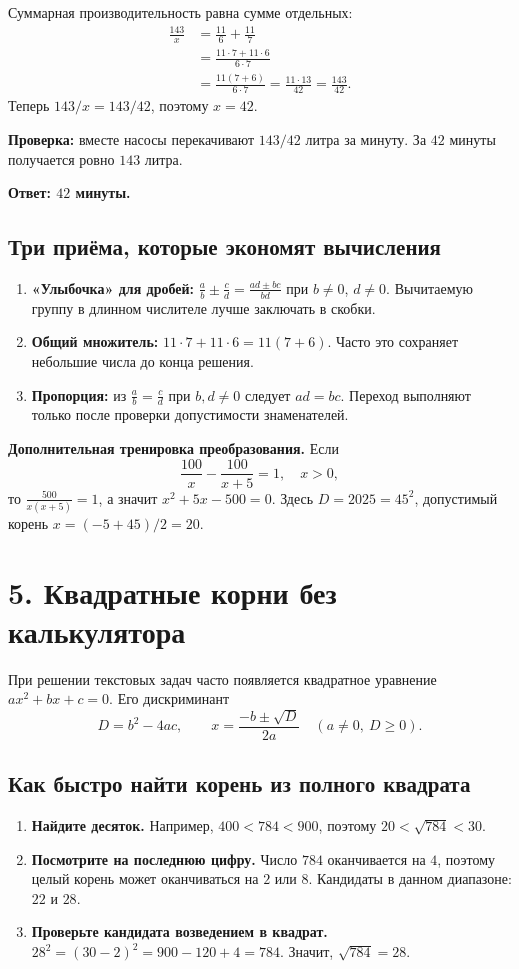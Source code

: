 \documentclass[a4paper,12pt]{article}
\newcommand{\topic}[1]{\section*{\textcolor{darkaccent}{#1}}}
\newcommand{\subtopic}[1]{\subsection*{\textcolor{darkaccent}{#1}}}
\newcommand{\linekey}[1]{\textcolor{darkaccent}{\textbf{#1}}}
\begin{document}
Суммарная производительность равна сумме отдельных:
\begin{align*}
\frac{143}{x}&=\frac{11}{6}+\frac{11}{7}\\
&=\frac{11\cdot7+11\cdot6}{6\cdot7}\\
&=\frac{11(7+6)}{6\cdot7}=\frac{11\cdot13}{42}=\frac{143}{42}.
\end{align*}
Теперь $143/x=143/42$, поэтому $x=42$.

\linekey{Проверка:} вместе насосы перекачивают $143/42$ литра за минуту. За $42$ минуты получается ровно $143$ литра.

\linekey{Ответ: $42$ минуты.}

\subtopic{Три приёма, которые экономят вычисления}
\begin{enumerate}[itemsep=3pt]
\item \textbf{«Улыбочка» для дробей:} $\displaystyle\frac{a}{b}\pm\frac{c}{d}=\frac{ad\pm bc}{bd}$ при $b\ne0$, $d\ne0$. Вычитаемую группу в длинном числителе лучше заключать в скобки.
\item \textbf{Общий множитель:} $11\cdot7+11\cdot6=11(7+6)$. Часто это сохраняет небольшие числа до конца решения.
\item \textbf{Пропорция:} из $\displaystyle\frac{a}{b}=\frac{c}{d}$ при $b,d\ne0$ следует $ad=bc$. Переход выполняют только после проверки допустимости знаменателей.
\end{enumerate}

\textbf{Дополнительная тренировка преобразования.} Если
\[
\frac{100}{x}-\frac{100}{x+5}=1,\quad x>0,
\]
то $\frac{500}{x(x+5)}=1$, а значит $x^2+5x-500=0$. Здесь $D=2025=45^2$, допустимый корень $x=(-5+45)/2=20$.

\clearpage
\topic{5. Квадратные корни без калькулятора}
При решении текстовых задач часто появляется квадратное уравнение $ax^2+bx+c=0$. Его дискриминант
\[
D=b^2-4ac,\qquad x=\frac{-b\pm\sqrt D}{2a}\quad(a\ne0,\ D\ge0).
\]

\subtopic{Как быстро найти корень из полного квадрата}
\begin{enumerate}[itemsep=5pt]
\item \textbf{Найдите десяток.} Например, $400<784<900$, поэтому $20<\sqrt{784}<30$.
\item \textbf{Посмотрите на последнюю цифру.} Число $784$ оканчивается на $4$, поэтому целый корень может оканчиваться на $2$ или $8$. Кандидаты в данном диапазоне: $22$ и $28$.
\item \textbf{Проверьте кандидата возведением в квадрат.} $28^2=(30-2)^2=900-120+4=784$. Значит, $\sqrt{784}=28$.
\end{enumerate}
\end{document}
